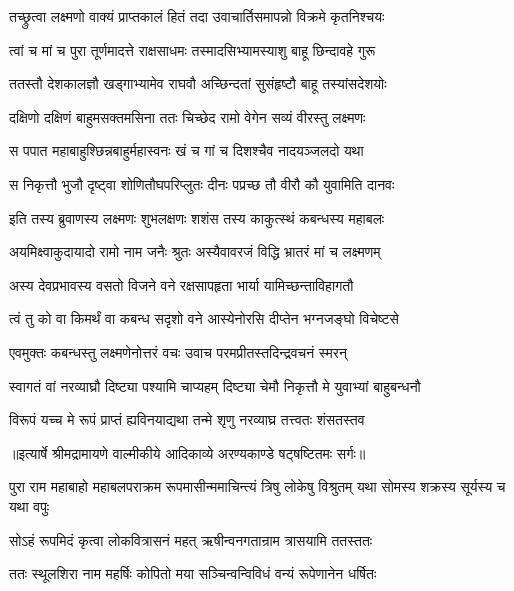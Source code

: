 \twolineshloka
{तच्छ्रुत्वा लक्ष्मणो वाक्यं प्राप्तकालं हितं तदा}
{उवाचार्तिसमापन्नो विक्रमे कृतनिश्चयः} %

\twolineshloka
{त्वां च मां च पुरा तूर्णमादत्ते राक्षसाधमः}
{तस्मादसिभ्यामस्याशु बाहू छिन्दावहे गुरू} %

\twolineshloka
{ततस्तौ देशकालज्ञौ खड्गाभ्यामेव राघवौ}
{अच्छिन्दतां सुसंहृष्टौ बाहू तस्यांसदेशयोः} %

\twolineshloka
{दक्षिणो दक्षिणं बाहुमसक्तमसिना ततः}
{चिच्छेद रामो वेगेन सव्यं वीरस्तु लक्ष्मणः} %

\twolineshloka
{स पपात महाबाहुश्छिन्नबाहुर्महास्वनः}
{खं च गां च दिशश्चैव नादयञ्जलदो यथा} %

\twolineshloka
{स निकृत्तौ भुजौ दृष्ट्वा शोणितौघपरिप्लुतः}
{दीनः पप्रच्छ तौ वीरौ कौ युवामिति दानवः} %

\twolineshloka
{इति तस्य ब्रुवाणस्य लक्ष्मणः शुभलक्षणः}
{शशंस तस्य काकुत्स्थं कबन्धस्य महाबलः} %

\twolineshloka
{अयमिक्ष्वाकुदायादो रामो नाम जनैः श्रुतः}
{अस्यैवावरजं विद्धि भ्रातरं मां च लक्ष्मणम्} %

\twolineshloka
{अस्य देवप्रभावस्य वसतो विजने वने}
{रक्षसापहृता भार्या यामिच्छन्ताविहागतौ} %

\twolineshloka
{त्वं तु को वा किमर्थं वा कबन्ध सदृशो वने}
{आस्येनोरसि दीप्तेन भग्नजङ्घो विचेष्टसे} %

\twolineshloka
{एवमुक्तः कबन्धस्तु लक्ष्मणेनोत्तरं वचः}
{उवाच परमप्रीतस्तदिन्द्रवचनं स्मरन्} %

\twolineshloka
{स्वागतं वां नरव्याघ्रौ दिष्ट्या पश्यामि चाप्यहम्}
{दिष्ट्या चेमौ निकृत्तौ मे युवाभ्यां बाहुबन्धनौ} %

\twolineshloka
{विरूपं यच्च मे रूपं प्राप्तं ह्यविनयाद्यथा}
{तन्मे शृणु नरव्याघ्र तत्त्वतः शंसतस्तव} %


{॥इत्यार्षे श्रीमद्रामायणे वाल्मीकीये आदिकाव्ये अरण्यकाण्डे षट्षष्टितमः सर्गः॥}


\threelineshloka
{पुरा राम महाबाहो महाबलपराक्रम}
{रूपमासीन्ममाचिन्त्यं त्रिषु लोकेषु विश्रुतम्}
{यथा सोमस्य शक्रस्य सूर्यस्य च यथा वपुः} %

\twolineshloka
{सोऽहं रूपमिदं कृत्वा लोकवित्रासनं महत्}
{ऋषीन्वनगतान्राम त्रासयामि ततस्ततः} %

\twolineshloka
{ततः स्थूलशिरा नाम महर्षिः कोपितो मया}
{सञ्चिन्वन्विविधं वन्यं रूपेणानेन धर्षितः} %

